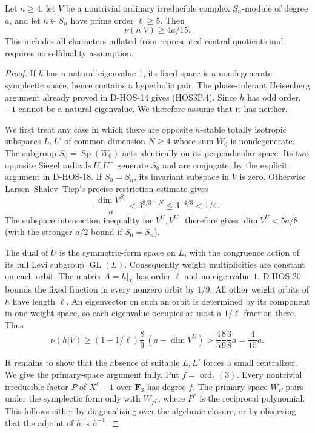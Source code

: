 \begin{theorem}
\label{D-HOS-21}
Let $n\ge4$, let $V$ be a nontrivial ordinary irreducible complex
$S_n$-module of degree $a$, and let $h\in S_n$ have prime order
$\ell\ge5$. Then
\[
                            \nu(h|V)\ge4a/15.               \tag{HOS3P.4}
\]
This includes all characters inflated from represented central
quotients and requires no selfduality assumption.
\end{theorem}

\begin{proof}
If $h$ has a natural eigenvalue $1$, its fixed space is a
nondegenerate symplectic space, hence contains a hyperbolic pair.
The phase-tolerant Heisenberg argument already proved in
D-HOS-14 gives (HOS3P.4). Since $h$ has odd order, $-1$ cannot
be a natural eigenvalue. We therefore assume that it has neither.

We first treat any case in which there are opposite $h$-stable
totally isotropic subspaces $L,L'$ of common dimension $N\ge4$
whose sum $W_0$ is nondegenerate. The subgroup
$S_0=\operatorname{Sp}(W_0)$ acts identically on its perpendicular
space. Its two opposite Siegel radicals $U,U^-$ generate $S_0$
and are conjugate, by the explicit argument in D-HOS-18.
If $S_0=S_n$, its invariant subspace in $V$ is zero. Otherwise
Larsen--Shalev--Tiep's precise restriction estimate
\cite[Proposition~4.2.3 and complete proof, pp.~1909--1912]{HOS:LST2011}
gives
\[
 \frac{\dim V^{S_0}}a<3^{8/3-N}\le3^{-4/3}<1/4.
                                                               \tag{HOS3P.5}
\]
The subspace intersection inequality for $V^U,V^{U^-}$ therefore
gives $\dim V^U<5a/8$ (with the stronger $a/2$ bound if $S_0=S_n$).

The dual of $U$ is the symmetric-form space on $L$, with the
congruence action of its full Levi subgroup $\operatorname{GL}(L)$.
Consequently weight multiplicities are constant on each orbit.
The matrix $A=h|_L$ has order $\ell$ and no eigenvalue $1$.
D-HOS-20 bounds the fixed fraction in every nonzero orbit by
$1/9$. All other weight orbits of $h$ have length $\ell$.
An eigenvector on such an orbit is determined by its component
in one weight space, so each eigenvalue occupies at most a
$1/\ell$ fraction there. Thus
\[
 \nu(h|V)\ge(1-1/\ell)\frac89\,(a-\dim V^U)
             >\frac45\frac89\frac38a=\frac4{15}a.           \tag{HOS3P.6}
\]

It remains to show that the absence of suitable $L,L'$ forces
a small centralizer. We give the primary-space argument fully.
Put $f=\operatorname{ord}_{\ell}(3)$. Every nontrivial irreducible
factor $P$ of $X^\ell-1$ over $\mathbf F_3$ has degree $f$.
The primary space $W_P$ pairs under the symplectic form only
with $W_{P^*}$, where $P^*$ is the reciprocal polynomial. This
follows either by diagonalizing over the algebraic closure, or
by observing that the adjoint of $h$ is $h^{-1}$.


\end{proof}
